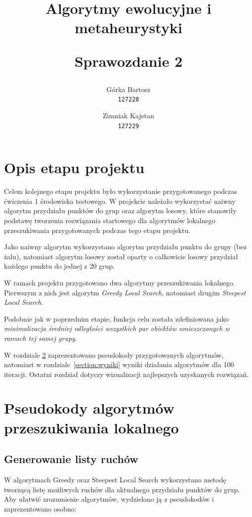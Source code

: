 \documentclass[main.tex]{subfiles}
\begin{document}
\title{
    \textbf{Algorytmy ewolucyjne i metaheurystyki}\\
    \begin{large}
        Sprawozdanie 2
    \end{large}
}

\author{
    Górka Bartosz\\
  \texttt{127228}
  \and
  Zimniak Kajetan\\
  \texttt{127229}
}

\date{}

\maketitle

\section{Opis etapu projektu}
Celem kolejnego etapu projektu było wykorzystanie przygotowanego podczas ćwiczenia 1 środowiska testowego. W projekcie należało wykorzystać naiwny algorytm przydziału punktów do grup oraz algorytm losowy, które stanowiły podstawę tworzenia rozwiązania startowego dla algorytmów lokalnego przeszukiwania przygotowanych podczas tego etapu projektu.

Jako naiwny algorytm wykorzystano algorytm przydziału punktu do grupy (bez żalu), natomiast algorytm losowy został oparty o całkowicie losowy przydział każdego punktu do jednej z 20 grup.

W ramach projektu przygotowano dwa algorytmy przeszukiwania lokalnego. Pierwszym z nich jest algorytm \textit{Greedy Local Search}, natomiast drugim \textit{Steepest Local Search}.

Podobnie jak w poprzednim etapie, funkcja celu została zdefiniowana jako \textit{minimalizacja średniej odległości wszystkich par obiektów umieszczonych w ramach tej samej grupy}.

W rozdziale \ref{section:pseudokody} zaprezentowano pseudokody przygotowanych algorytmów, natomiast w rozdziale\leavevmode\nobreak\ \ref{section:wyniki} wyniki działania algorytmów dla 100 iteracji. Ostatni rozdział dotyczy wizualizacji najlepszych uzyskanych rozwiązań.

\section{Pseudokody algorytmów przeszukiwania lokalnego}
\label{section:pseudokody}
\subsection{Generowanie listy ruchów}
W algorytmach Greedy oraz Steepest Local Search wykorzystano metodę tworzącą listę możliwych ruchów dla aktualnego przydziału punktów do grup. Aby ułatwić zrozumienie algorytmów, wydzielono ją z pseudokodów i zaprezentowano osobno:
\end{document}
